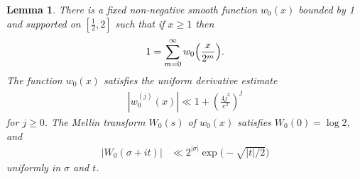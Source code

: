 \documentclass[12pt]{amsart}
\theoremstyle{plain}
\newtheorem{lemma}[theorem]{Lemma}
\theoremstyle{definition}
\theoremstyle{remark}
\begin{document}
\begin{lemma}\label{lem:Partition}
There is a fixed non-negative smooth function $w_0(x)$ bounded by 1 and supported on $[\frac{1}{2},2]$ such that if $x\geq 1$ then
\begin{align*}
1 = \sum_{m=0}^\infty w_0\Bigl(\frac{x}{2^m} \Bigr).
\end{align*}
The function $w_0(x)$ satisfies the uniform derivative estimate
\begin{align*}
|w_0^{(j)}(x)| \ll 1+ \left( \frac{4j^2}{e^2}\right)^j
\end{align*}
for $j\geq 0$. The Mellin transform $W_0(s)$ of $w_0(x)$ satisfies $W_0(0) = \log 2$, and
\begin{align*}
|W_0(\sigma+it)| &\ll 2^{|\sigma|}\exp \Big(- \sqrt{|t|/2} \Big)
\end{align*}
uniformly in $\sigma$ and $t$.
\end{lemma}
\end{document}

